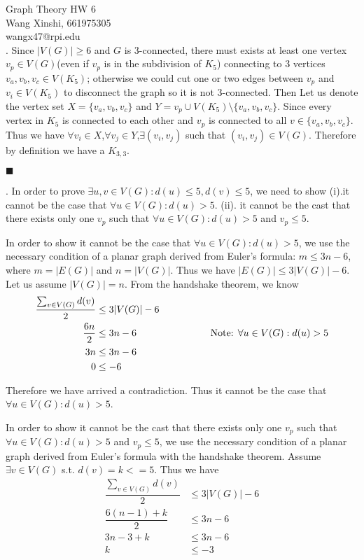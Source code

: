 \documentclass[12pt]{article}
\begin{document}
	\noindent Graph Theory HW 6\\
	Wang Xinshi, 661975305\\
	wangx47@rpi.edu\\
	
	. Since $|V(G)| \geq 6$ and $G$ is $3$-connected, there must exists at least one vertex $v_p \in V(G)$(even if $v_p$ is in the subdivision of $K_5$) connecting to 3 vertices $v_a,v_b,v_c \in V(K_5)$; otherwise we could cut one or two edges between $v_p$ and $v_i \in V(K_5)$ to disconnect the graph so it is not 3-connected. Then Let us denote the vertex set $X = \{v_a,v_b,v_c\}$ and $Y = v_p \cup V(K_5) \setminus \{v_a,v_b,v_c\}$. Since every vertex in $K_5$ is connected to each other and $v_p$ is connected to all $v \in \{v_a,v_b,v_c\}$. Thus we have $\forall v_i \in X$,$\forall v_j \in Y$,$\exists (v_i,v_j)$ such that $(v_i,v_j) \in V(G)$. Therefore by definition we have a $K_{3,3}$.
	
	 	\hfill $\blacksquare$
	 	
	 . In order to prove $\exists u,v\in V(G) : d(u) \leq 5, d(v) \leq 5$, we need to show (i).it cannot be the case that $\forall u \in V(G): d(u) > 5$. (ii). it cannot be the cast that there exists only one $v_p$ such that $\forall u \in V(G): d(u) > 5$ and $v_p \leq 5$.
	 
	 In order to show it cannot be the case that $\forall u \in V(G): d(u) > 5$, we use the necessary condition of a planar graph derived from Euler's formula: $m \leq 3n-6$, where $m = |E(G)|$ and $n = |V(G)|$. Thus we have $|E(G)| \leq 3|V(G)| - 6$. Let us assume $|V(G)| = n$. From the handshake theorem, we know
	 \begin{align*}
	 	\dfrac{\sum_{v \in V(G)}d(v)}{2} &\leq 3|V(G)|-6\\
	 	\dfrac{6n}{2} &\leq 3n-6  \text{\hspace{1in} Note: $\forall u \in V(G): d(u) > 5$}\\
	 	3n &\leq 3n-6\\
	 	0 &\leq -6
	 \end{align*}
 
 	Therefore we have arrived a contradiction. Thus it cannot be the case that  $\forall u \in V(G): d(u) > 5$.
 	
 	In order to show it cannot be the cast that there exists only one $v_p$ such that $\forall u \in V(G): d(u) > 5$ and $v_p \leq 5$,  we use the necessary condition of a planar graph derived from Euler's formula with the handshake theorem. Assume $\exists v \in V(G)$ s.t. $d(v) = k <= 5$. Thus we have 
 	\begin{align*}
 		\dfrac{\sum_{v \in V(G)}d(v)}{2} &\leq 3|V(G)|-6\\
 		\dfrac{6(n-1)+k}{2} &\leq 3n-6\\  
 		3n - 3 + k &\leq 3n-6\\
 		k &\leq -3
 	\end{align*}
	 
\end{document}
